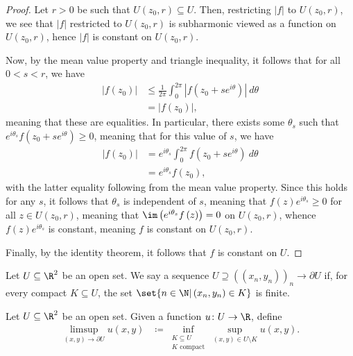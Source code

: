 \documentclass[10pt]{mypackage}
\begin{document}
\begin{proof}
  Let $r > 0$ be such that $U\left( z_0,r \right)\subseteq U$. Then, restricting $\left\vert f \right\vert$ to $U\left( z_0,r \right)$, we see that $\left\vert f \right\vert$ restricted to $U\left( z_0,r \right)$ is subharmonic viewed as a function on $U\left( z_0,r \right)$, hence $\left\vert f \right\vert$ is constant on $U\left( z_0,r \right)$.\newline

  Now, by the mean value property and triangle inequality, it follows that for all $0 < s < r$, we have
  \begin{align*}
    \left\vert f\left( z_0 \right) \right\vert &\leq \frac{1}{2\pi} \int_{0}^{2\pi} \left\vert f\left( z_0 + se^{i\theta} \right) \right\vert\:d\theta\\
                                               &= \left\vert f\left( z_0 \right) \right\vert,
  \end{align*}
  meaning that these are equalities. In particular, there exists some $\theta_s$ such that $e^{i\theta_s} f\left( z_0 + se^{i\theta} \right) \geq 0$, meaning that for this value of $s$, we have
  \begin{align*}
    \left\vert f\left( z_0 \right) \right\vert &= e^{i\theta_s} \int_{0}^{2\pi} f\left( z_0 + se^{i\theta} \right)\:d\theta\\
                                               &= e^{i\theta_s} f\left( z_0 \right),
  \end{align*}
  with the latter equality following from the mean value property. Since this holds for any $s$, it follows that $\theta_s$ is independent of $s$, meaning that $f(z)e^{i\theta_s} \geq 0$ for all $z\in U\left( z_0,r \right)$, meaning that $\im\left( e^{i\theta_s}f\left( z \right) \right) = 0$ on $U\left( z_0,r \right)$, whence $f(z)e^{i\theta_s}$ is constant, meaning $f$ is constant on $U\left( z_0,r \right)$.\newline

  Finally, by the identity theorem, it follows that $f$ is constant on $U$.
\end{proof}
\begin{definition}
  Let $U\subseteq \R^{2}$ be an open set. We say a sequence $U\supseteq \left( \left( x_n,y_n \right) \right)_n\rightarrow \partial U$ if, for every compact $K\subseteq U$, the set $\set{n\in \N | \left( x_n,y_n \right)\in K}$ is finite.
\end{definition}
\begin{definition}
  Let $U\subseteq \R^{2}$ be an open set. Given a function $u\colon U\rightarrow \R$, define
  \begin{align*}
    \limsup_{\left( x,y \right)\rightarrow \partial U} u\left( x,y \right) &\coloneq \inf_{\substack{K\subseteq U\\K\text{ compact}}} \sup_{\left( x,y \right)\in U\setminus K} u\left( x,y \right).
  \end{align*}
\end{definition}
\end{document}
